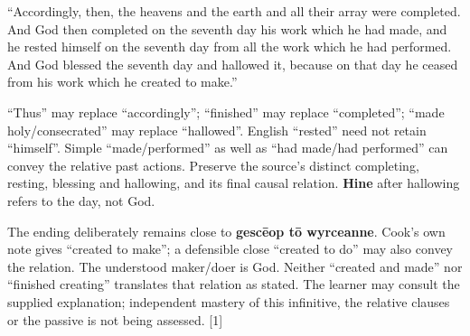 \par\begin{minipage}{\linewidth}\raggedright

“Accordingly, then, the heavens and the earth and all their array were completed. And God then completed on the seventh day his work which he had made, and he rested himself on the seventh day from all the work which he had performed. And God blessed the seventh day and hallowed it, because on that day he ceased from his work which he created to make.”

“Thus” may replace “accordingly”; “finished” may replace “completed”; “made holy/\allowbreak{}consecrated” may replace “hallowed”. English “rested” need not retain “himself”. Simple “made/\allowbreak{}performed” as well as “had made/\allowbreak{}had performed” can convey the relative past actions. Preserve the source’s distinct completing, resting, blessing and hallowing, and its final causal relation. \textbf{Hine} after hallowing refers to the day, not God.

The ending deliberately remains close to \textbf{gescēop tō wyrceanne}. Cook’s own note gives “created to make”; a defensible close “created to do” may also convey the relation. The understood maker/\allowbreak{}doer is God. Neither “created and made” nor “finished creating” translates that relation as stated. The learner may consult the supplied explanation; independent mastery of this infinitive, the relative clauses or the passive is not being assessed. [1]

\end{minipage}\par\addvspace{4pt}

